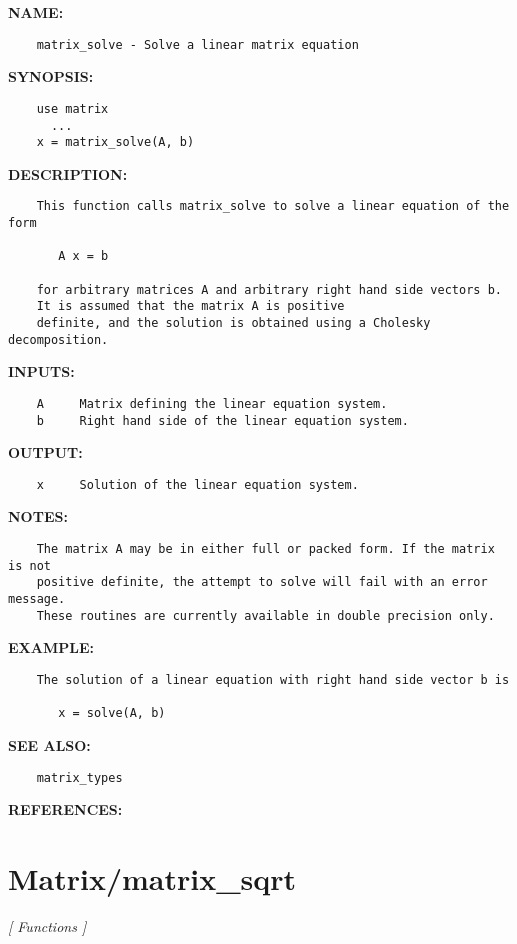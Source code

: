 \label{ch:robo30}
\label{ch:Matrix_matrix_solve}
\textbf{NAME:}\hspace{0.08in}\begin{Verbatim}
    matrix_solve - Solve a linear matrix equation
\end{Verbatim}
\textbf{SYNOPSIS:}\hspace{0.08in}\begin{Verbatim}
    use matrix
      ...
    x = matrix_solve(A, b)
\end{Verbatim}
\textbf{DESCRIPTION:}\hspace{0.08in}\begin{Verbatim}
    This function calls matrix_solve to solve a linear equation of the form

       A x = b

    for arbitrary matrices A and arbitrary right hand side vectors b. 
    It is assumed that the matrix A is positive 
    definite, and the solution is obtained using a Cholesky decomposition. 
\end{Verbatim}
\textbf{INPUTS:}\hspace{0.08in}\begin{Verbatim}
    A     Matrix defining the linear equation system.
    b     Right hand side of the linear equation system.
\end{Verbatim}
\textbf{OUTPUT:}\hspace{0.08in}\begin{Verbatim}
    x     Solution of the linear equation system.
\end{Verbatim}
\textbf{NOTES:}\hspace{0.08in}\begin{Verbatim}
    The matrix A may be in either full or packed form. If the matrix is not 
    positive definite, the attempt to solve will fail with an error message.
    These routines are currently available in double precision only.
\end{Verbatim}
\textbf{EXAMPLE:}\hspace{0.08in}\begin{Verbatim}
    The solution of a linear equation with right hand side vector b is

       x = solve(A, b)
\end{Verbatim}
\textbf{SEE ALSO:}\hspace{0.08in}\begin{Verbatim}
    matrix_types
\end{Verbatim}
\textbf{REFERENCES:}\hspace{0.08in}\section{Matrix/matrix\_sqrt}
\textsl{[ Functions ]}

